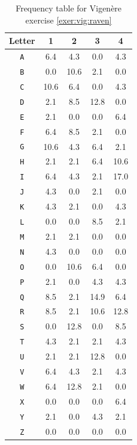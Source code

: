 \documentclass{book}
\theoremstyle{plain}
\theoremstyle{definition}
\newcommand{\ciphertext}[1]{\texttt{#1}} %
\begin{document}
\begin{table}[H]
\begin{center}
\begin{tabular}{c|cccc}
Letter & 1 & 2 & 3 & 4 \\
\hline
\ciphertext{A} & 6.4 & 4.3 & 0.0 & 4.3 \\
\ciphertext{B} & 0.0 & 10.6 & 2.1 & 0.0 \\
\ciphertext{C} & 10.6 & 6.4 & 0.0 & 4.3 \\
\ciphertext{D} & 2.1 & 8.5 & 12.8 & 0.0 \\
\ciphertext{E} & 2.1 & 0.0 & 0.0 & 6.4 \\
\ciphertext{F} & 6.4 & 8.5 & 2.1 & 0.0 \\
\ciphertext{G} & 10.6 & 4.3 & 6.4 & 2.1 \\
\ciphertext{H} & 2.1 & 2.1 & 6.4 & 10.6 \\
\ciphertext{I} & 6.4 & 4.3 & 2.1 & 17.0 \\
\ciphertext{J} & 4.3 & 0.0 & 2.1 & 0.0 \\
\ciphertext{K} & 4.3 & 2.1 & 0.0 & 4.3 \\
\ciphertext{L} & 0.0 & 0.0 & 8.5 & 2.1 \\
\ciphertext{M} & 2.1 & 2.1 & 0.0 & 0.0 \\
\ciphertext{N} & 4.3 & 0.0 & 0.0 & 0.0 \\
\ciphertext{O} & 0.0 & 10.6 & 6.4 & 0.0 \\
\ciphertext{P} & 2.1 & 0.0 & 4.3 & 4.3 \\
\ciphertext{Q} & 8.5 & 2.1 & 14.9 & 6.4 \\
\ciphertext{R} & 8.5 & 2.1 & 10.6 & 12.8 \\
\ciphertext{S} & 0.0 & 12.8 & 0.0 & 8.5 \\
\ciphertext{T} & 4.3 & 2.1 & 2.1 & 4.3 \\
\ciphertext{U} & 2.1 & 2.1 & 12.8 & 0.0 \\
\ciphertext{V} & 6.4 & 4.3 & 2.1 & 4.3 \\
\ciphertext{W} & 6.4 & 12.8 & 2.1 & 0.0 \\
\ciphertext{X} & 0.0 & 0.0 & 0.0 & 6.4 \\
\ciphertext{Y} & 2.1 & 0.0 & 4.3 & 2.1 \\
\ciphertext{Z} & 0.0 & 0.0 & 0.0 & 0.0
\end{tabular}
\caption{Frequency table for Vigen\`{e}re exercise \ref{exer:vig:raven}}
\label{app:vig:raven}
\end{center}
\end{table}
\end{document}
